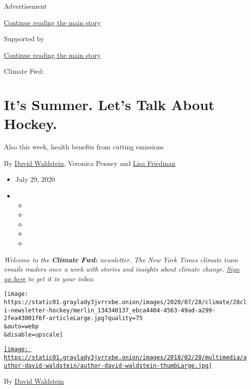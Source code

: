 Advertisement

\protect\hyperlink{after-top}{Continue reading the main story}

Supported by

\protect\hyperlink{after-sponsor}{Continue reading the main story}

Climate Fwd:

\hypertarget{its-summer-lets-talk-about-hockey}{%
\section{It's Summer. Let's Talk About
Hockey.}\label{its-summer-lets-talk-about-hockey}}

Also this week, health benefits from cutting emissions

By \href{https://www.nytimes3xbfgragh.onion/by/david-waldstein}{David
Waldstein}, Veronica Penney and
\href{https://www.nytimes3xbfgragh.onion/by/lisa-friedman}{Lisa
Friedman}

\begin{itemize}
\item
  July 29, 2020
\item
  \begin{itemize}
  \item
  \item
  \item
  \item
  \item
  \end{itemize}
\end{itemize}

\emph{Welcome to the} \emph{\textbf{Climate Fwd:}} \emph{newsletter. The
New York Times climate team emails readers once a week with stories and
insights about climate change.}
\href{https://www.nytimes3xbfgragh.onion/newsletters/climate-change}{\emph{Sign
up here}} \emph{to get it in your inbox.}

\texttt{[image: https://static01.graylady3jvrrxbe.onion/images/2020/07/28/climate/28cli-newsletter-hockey/merlin\_134340137\_ebca4404-4563-49ad-a299-2fea43001f6f-articleLarge.jpg?quality=75\\\&auto=webp\\\&disable=upscale]}

\href{https://www.nytimes3xbfgragh.onion/by/david-waldstein}{\texttt{[image: https://static01.graylady3jvrrxbe.onion/images/2018/02/20/multimedia/author-david-waldstein/author-david-waldstein-thumbLarge.jpg]}}

By \href{https://www.nytimes3xbfgragh.onion/by/david-waldstein}{David
Waldstein}

